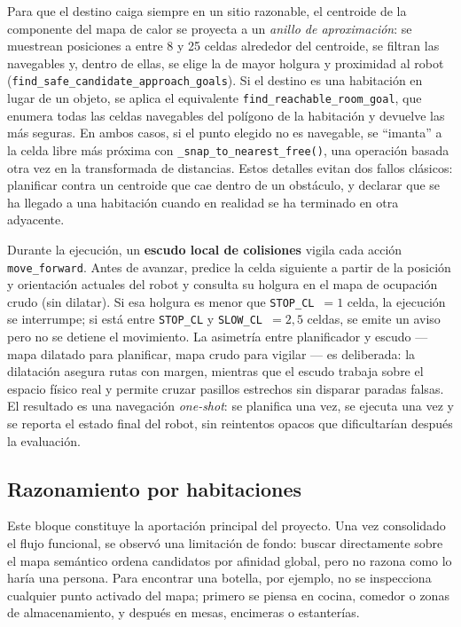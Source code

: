 \documentclass[11pt,fleqn,openany]{book} %
\begin{document}
Para que el destino caiga siempre en un sitio razonable, el centroide de la componente del mapa de calor se proyecta a un \emph{anillo de aproximación}: se muestrean posiciones a entre 8 y 25 celdas alrededor del centroide, se filtran las navegables y, dentro de ellas, se elige la de mayor holgura y proximidad al robot (\texttt{find\_safe\_candidate\_approach\_goals}). Si el destino es una habitación en lugar de un objeto, se aplica el equivalente \texttt{find\_reachable\_room\_goal}, que enumera todas las celdas navegables del polígono de la habitación y devuelve las más seguras. En ambos casos, si el punto elegido no es navegable, se ``imanta'' a la celda libre más próxima con \texttt{\_snap\_to\_nearest\_free()}, una operación basada otra vez en la transformada de distancias. Estos detalles evitan dos fallos clásicos: planificar contra un centroide que cae dentro de un obstáculo, y declarar que se ha llegado a una habitación cuando en realidad se ha terminado en otra adyacente.

Durante la ejecución, un \textbf{escudo local de colisiones} vigila cada acción \texttt{move\_forward}. Antes de avanzar, predice la celda siguiente a partir de la posición y orientación actuales del robot y consulta su holgura en el mapa de ocupación crudo (sin dilatar). Si esa holgura es menor que \texttt{STOP\_CL}~$=1$ celda, la ejecución se interrumpe; si está entre \texttt{STOP\_CL} y \texttt{SLOW\_CL}~$=2{,}5$ celdas, se emite un aviso pero no se detiene el movimiento. La asimetría entre planificador y escudo --- mapa dilatado para planificar, mapa crudo para vigilar --- es deliberada: la dilatación asegura rutas con margen, mientras que el escudo trabaja sobre el espacio físico real y permite cruzar pasillos estrechos sin disparar paradas falsas. El resultado es una navegación \emph{one-shot}: se planifica una vez, se ejecuta una vez y se reporta el estado final del robot, sin reintentos opacos que dificultarían después la evaluación.

\subsection*{Razonamiento por habitaciones}

Este bloque constituye la aportación principal del proyecto. Una vez consolidado el flujo funcional, se observó una limitación de fondo: buscar directamente sobre el mapa semántico ordena candidatos por afinidad global, pero no razona como lo haría una persona. Para encontrar una botella, por ejemplo, no se inspecciona cualquier punto activado del mapa; primero se piensa en cocina, comedor o zonas de almacenamiento, y después en mesas, encimeras o estanterías.
\end{document}
